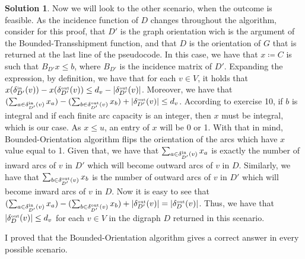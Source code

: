 \documentclass[11pt,leqno,final]{amsart}
\theoremstyle{definition}
\newtheorem{solution}{Solution}
\begin{document}
\begin{solution}
Now we will look to the other scenario, when the outcome is feasible. As the incidence function of $D$ changes throughout the algorithm, consider for this proof, that $D'$ is the graph orientation wich is the argument of the Bounded-Transshipment function, and that $D$ is the orientation of $G$ that is returned at the last line of the pseudocode. In this case, we have that $x \coloneqq C$ is such that $B_{D'} x \leq b$, where $B_{D'}$ is the incidence matrix of $D'$. Expanding the expression, by definition, we have that for each $v \in V$, it holds that $x(\deltain[D'](v)) - x(\deltaout[D'](v)) \leq d_v - |\deltaout[D'](v)|$. Moreover, we have that $(\sum_{a \in \deltain[D'](v)} x_a) - (\sum_{b \in \deltaout[D'](v)} x_b) + |\deltaout[D'](v)| \leq d_v $. According to exercise 10, if $b$ is integral and if each finite arc capacity is an integer, then $x$ must be integral, which is our case. As $x \leq u$, an entry of $x$ will be 0 or 1. With that in mind, Bounded-Orientation algorithm flips the orientation of the arcs which have $x$ value equal to 1. Given that, we have that $\sum_{a \in \deltain[D'](v)} x_a $ is exactly the number of inward arcs of $v$ in $D'$ which will become outward arcs of $v$ in $D$. Similarly, we have that $\sum_{b \in \deltaout[D'](v)} x_b$ is the number of outward arcs of $v$ in $D'$ which will become inward arcs of $v$ in $D$. Now it is easy to see that $(\sum_{a \in \deltain[D'](v)} x_a) - (\sum_{b \in \deltaout[D'](v)} x_b) + |\deltaout[D'](v)| = |\deltaout[D](v)|$. Thus, we have that $|\deltaout[D](v)| \leq d_v$ for each $v \in V$ in the digraph $D$ returned in this scenario.

I proved that the Bounded-Orientation algorithm gives a correct answer in every possible scenario.

\end{solution}
\end{document}
